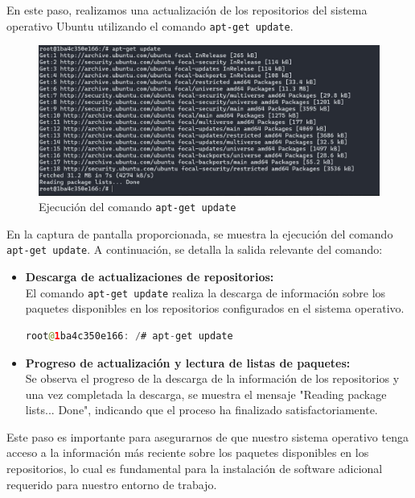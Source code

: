 \documentclass{article}
\begin{document}
En este paso, realizamos una actualización de los repositorios del sistema operativo Ubuntu utilizando el comando \texttt{apt-get update}.

\begin{figure}[h]
    \centering
    \includegraphics[width=1\textwidth]{latex/img/apt-get-update.png}
    \caption{Ejecución del comando \texttt{apt-get update}}
    \label{fig:apt-get-update}
\end{figure}

En la captura de pantalla proporcionada, se muestra la ejecución del comando \texttt{apt-get update}. A continuación, se detalla la salida relevante del comando:

\begin{itemize}
    \item \textbf{Descarga de actualizaciones de repositorios:} \\
    El comando \texttt{apt-get update} realiza la descarga de información sobre los paquetes disponibles en los repositorios configurados en el sistema operativo.
    \begin{lstlisting}[language=java]
    root@1ba4c350e166: /# apt-get update
    \end{lstlisting}

    \item \textbf{Progreso de actualización y lectura de listas de paquetes:} \\
    Se observa el progreso de la descarga de la información de los repositorios y una vez completada la descarga, se muestra el mensaje "Reading package lists... Done", indicando que el proceso ha finalizado satisfactoriamente.
\end{itemize}

Este paso es importante para asegurarnos de que nuestro sistema operativo tenga acceso a la información más reciente sobre los paquetes disponibles en los repositorios, lo cual es fundamental para la instalación de software adicional requerido para nuestro entorno de trabajo.
\end{document}
